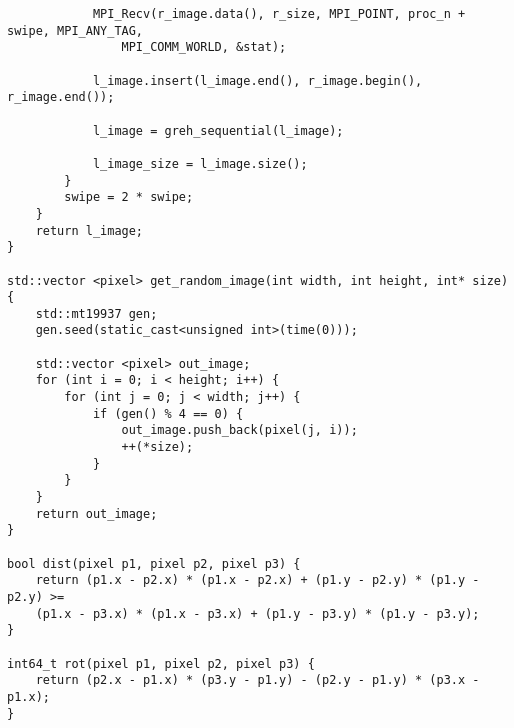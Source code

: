 \documentclass{report}
\begin{document}
\begin{lstlisting}
            MPI_Recv(r_image.data(), r_size, MPI_POINT, proc_n + swipe, MPI_ANY_TAG,
                MPI_COMM_WORLD, &stat);

            l_image.insert(l_image.end(), r_image.begin(), r_image.end());

            l_image = greh_sequential(l_image);

            l_image_size = l_image.size();
        }
        swipe = 2 * swipe;
    }
    return l_image;
}

std::vector <pixel> get_random_image(int width, int height, int* size) {
    std::mt19937 gen;
    gen.seed(static_cast<unsigned int>(time(0)));

    std::vector <pixel> out_image;
    for (int i = 0; i < height; i++) {
        for (int j = 0; j < width; j++) {
            if (gen() % 4 == 0) {
                out_image.push_back(pixel(j, i));
                ++(*size);
            }
        }
    }
    return out_image;
}

bool dist(pixel p1, pixel p2, pixel p3) {
    return (p1.x - p2.x) * (p1.x - p2.x) + (p1.y - p2.y) * (p1.y - p2.y) >=
    (p1.x - p3.x) * (p1.x - p3.x) + (p1.y - p3.y) * (p1.y - p3.y);
}

int64_t rot(pixel p1, pixel p2, pixel p3) {
    return (p2.x - p1.x) * (p3.y - p1.y) - (p2.y - p1.y) * (p3.x - p1.x);
}

\end{lstlisting}
    
\end{document}
